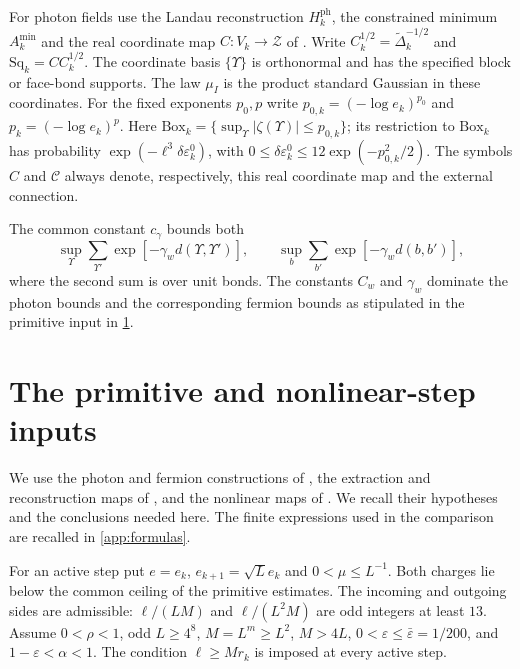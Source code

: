 For photon fields use the Landau reconstruction $H_k^{\mathrm{ph}}$,
the constrained minimum $A_k^{\min}$ and the real coordinate map
$C:V_k\to\mathcal Z$ of
\cite[Theorem~A]{MaxwellBlockManuscript}. Write
$C_k^{1/2}=\widetilde\Delta_k^{-1/2}$ and
$\mathrm{Sq}_k=CC_k^{1/2}$. The coordinate basis $\{\Upsilon\}$ is
orthonormal and has the specified block or face-bond supports.
The law $\mu_I$ is the product standard Gaussian in these coordinates.
For the fixed exponents $p_0,p$ write
$p_{0,k}=(-\log e_k)^{p_0}$ and $p_k=(-\log e_k)^p$.
Here $\mathrm{Box}_k=\{\sup_\Upsilon|\zeta(\Upsilon)|\le p_{0,k}\}$;
its restriction to $\mathrm{Box}_k$ has probability
$\exp(-\ell^3\delta\varepsilon_k^0)$, with
$0\le\delta\varepsilon_k^0\le12\exp(-p_{0,k}^2/2)$.
The symbols $C$ and $\mathscr C$ always denote, respectively,
this real coordinate map and the external connection.

The common constant $c_\gamma$ bounds both
\[
 \sup_\Upsilon\sum_{\Upsilon'}\exp[-\gamma_wd(\Upsilon,\Upsilon')],
 \qquad \sup_b\sum_{b'}\exp[-\gamma_wd(b,b')],
\]
where the second sum is over unit bonds. The constants $C_w$ and
$\gamma_w$ dominate the photon bounds and the corresponding
fermion bounds as stipulated in the primitive input in \cref{sec:inputs}.
\section{The primitive and nonlinear-step inputs}\label{sec:inputs}

We use the photon and fermion constructions of
\cite{MaxwellBlockManuscript,FermionBlockManuscript}, the extraction
and reconstruction maps of \cite{NormalizedContraction}, and the
nonlinear maps of \cite{NonlinearStep}.
We recall their hypotheses and the conclusions needed here.
The finite expressions used in the comparison are recalled in \cref{app:formulas}.

For an active step put \(e=e_k\), \(e_{k+1}=\sqrt L e_k\) and
\(0<\mu\le L^{-1}\). Both charges lie below the common ceiling of the
primitive estimates. The incoming and outgoing sides are admissible:
\(\ell/(LM)\) and \(\ell/(L^2M)\) are odd integers at least \(13\).
Assume \(0<\rho<1\), odd \(L\ge4^8\),
\(M=L^m\ge L^2\), \(M>4L\),
\(0<\varepsilon\le\bar\varepsilon=1/200\), and
\(1-\varepsilon<\alpha<1\). The condition \(\ell\ge Mr_k\)
is imposed at every active step.

